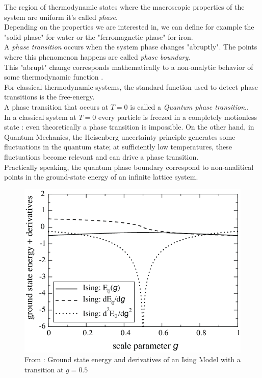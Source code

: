 \documentclass[12pt,a4paper]{book}
\theoremstyle{definition}
\begin{document}
The region of thermodynamic states where the macroscopic properties of the system are uniform it's called \textit{phase}.\\
Depending on the properties we are interested in, we can define for example the "solid phase" for water or the "ferromagnetic phase" for iron.\\
A \textit{phase transition} occurs when the system phase changes "abruptly".
The points where this phenomenon happens are called \textit{phase boundary}.\\
This "abrupt" change corresponds mathematically to a non-analytic behavior of some thermodynamic function \cite{Goldenfeld_1992}.\\ 
For classical thermodynamic systems, the standard function used to detect phase transitions is the free-energy.\\
A phase transition that occurs at $T=0$ is called a \textit{Quantum phase transition}.\cite{sachdev_2011}.\\
In a classical system at $T=0$ every particle is freezed in a completely motionless state : even theoretically a phase transition is impossible. On the other hand, in Quantum Mechanics, the Heisenberg uncertainty principle generates some fluctuations in the quantum state;
at sufficiently low temperatures, these fluctuations become relevant and can drive a phase transition.\\
Practically speaking, the quantum phase boundary correspond to non-analitical points in the ground-state energy of an infinite lattice system.\\ 
\begin{figure}[h]
	\centering
	\includegraphics[width=0.7\linewidth]{graphs/divergence-ising-model}
	\caption{From \cite{PhysRevA.81.032305}: Ground state energy and derivatives of an Ising Model with a transition at $g=0.5$ }
	\label{fig:divergence-ising-model}
\end{figure}
\end{document}
